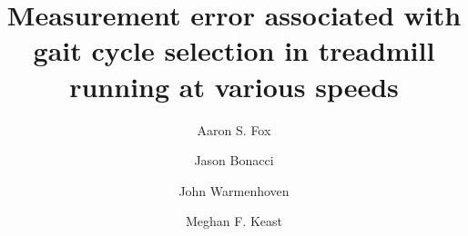 \documentclass[]{elsarticle} %
\begin{document}
\begin{frontmatter}

  \title{Measurement error associated with gait cycle selection in
treadmill running at various speeds}
    \author[Centre for Sport Research]{Aaron S. Fox}
  
    \author[Centre for Sport Research]{Jason Bonacci}
  
    \author[UNSW]{John Warmenhoven}
  
    \author[Centre for Sport Research]{Meghan F. Keast}
  
      \address[Centre for Sport Research]{Centre for Sport Research,
School of Exercise and Nutrition Sciences, Deakin University, Geelong,
Australia}
    \address[UNSW]{School of Engineering and Information Technology,
University of New South Wales, Canberra, Australia}
  

\end{frontmatter}
\end{document}

